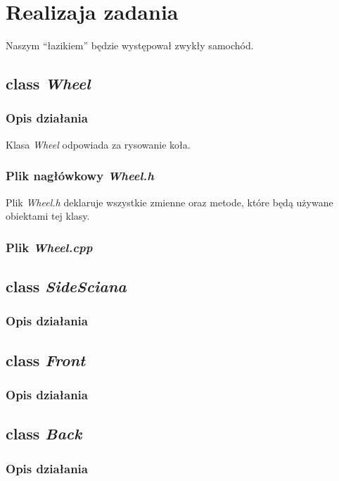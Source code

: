 \documentclass[a4paper, 12pt]{report}
\begin{document}
\section{Realizaja zadania}

Naszym ``łazikiem'' będzie występował zwykły samochód.

\subsection{class \emph{Wheel}}
\subsubsection{Opis działania}

Klasa \emph{Wheel} odpowiada za rysowanie koła.


\subsubsection{Plik nagłówkowy \emph{Wheel.h}}

Plik \emph{Wheel.h} deklaruje wszystkie zmienne oraz metode, które będą używane obiektami tej klasy.

\subsubsection{Plik \emph{Wheel.cpp}}


\subsection{class \emph{SideSciana}}
\subsubsection{Opis działania}

\subsection{class \emph{Front}}
\subsubsection{Opis działania}

\subsection{class \emph{Back}}
\subsubsection{Opis działania}
\end{document}
